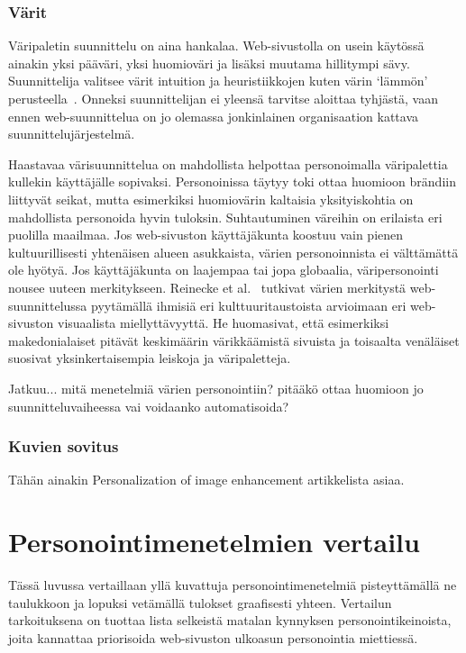 \documentclass[finnish, 12pt, a4paper, elec, utf8, a-1b, online]{aaltothesis}
\begin{document}
\subsubsection{Värit}

Väripaletin suunnittelu on aina hankalaa. Web-sivustolla on usein käytössä
ainakin yksi pääväri, yksi huomioväri ja lisäksi muutama hillitympi sävy.
Suunnittelija valitsee värit intuition ja heuristiikkojen kuten värin `lämmön'
perusteella~\cite{odonovan_2015}. Onneksi suunnittelijan ei yleensä tarvitse
aloittaa tyhjästä, vaan ennen web-suunnittelua on jo olemassa jonkinlainen
organisaation kattava suunnittelujärjestelmä.

Haastavaa värisuunnittelua on mahdollista helpottaa personoimalla väripalettia
kullekin käyttäjälle sopivaksi. Personoinissa täytyy toki ottaa huomioon
brändiin liittyvät seikat, mutta esimerkiksi huomiovärin kaltaisia
yksityiskohtia on mahdollista personoida hyvin tuloksin. Suhtautuminen väreihin
on erilaista eri puolilla maailmaa. Jos web-sivuston käyttäjäkunta koostuu vain
pienen kultuurillisesti yhtenäisen alueen asukkaista, värien personoinnista ei
välttämättä ole hyötyä. Jos käyttäjäkunta on laajempaa tai jopa globaalia,
väripersonointi nousee uuteen merkitykseen. Reinecke et
al.~\cite{10.1145/2556288.2557052} tutkivat värien merkitystä web-suunnittelussa
pyytämällä ihmisiä eri kulttuuritaustoista arvioimaan eri web-sivuston
visuaalista miellyttävyyttä. He huomasivat, että esimerkiksi makedonialaiset
pitävät keskimäärin värikkäämistä sivuista ja toisaalta venäläiset suosivat
yksinkertaisempia leiskoja ja väripaletteja.

Jatkuu... mitä menetelmiä värien personointiin? pitääkö ottaa huomioon jo
suunnitteluvaiheessa vai voidaanko automatisoida?

\subsubsection{Kuvien sovitus}

Tähän ainakin Personalization of image enhancement artikkelista asiaa.

\clearpage

\section{Personointimenetelmien vertailu}

Tässä luvussa vertaillaan yllä kuvattuja personointimenetelmiä pisteyttämällä ne
taulukkoon ja lopuksi vetämällä tulokset graafisesti yhteen. Vertailun
tarkoituksena on tuottaa lista selkeistä matalan kynnyksen personointikeinoista,
joita kannattaa priorisoida web-sivuston ulkoasun personointia miettiessä.
\end{document}
